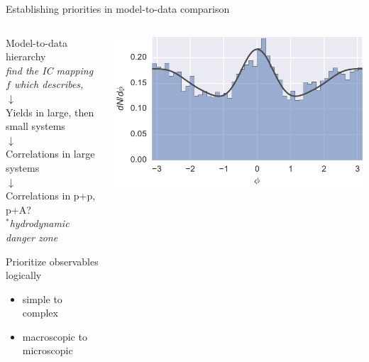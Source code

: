 \documentclass[aspectratio=43]{beamer}
\theoremstyle{definition}
\begin{document}
\begin{frame}{Establishing priorities in model-to-data comparison}
  \begin{columns}
    \begin{column}{.4\textwidth}
      \centering
      Model-to-data hierarchy \\[1ex]
      \scriptsize \emph{find the IC mapping $f$ which describes,} \\[1ex]
      $\downarrow$ \\[1ex]
      Yields in large, then small systems \\[1ex] 
      $\downarrow$ \\[1ex]
      Correlations in large systems \\[1ex]
      $\downarrow$ \\[1ex]
      Correlations in p+p, p+A? \\[1ex]
      \emph{$^*$hydrodynamic danger zone} \\
      \bigskip
      \begin{block}{\scriptsize Prioritize observables logically}
        \vspace{-.1 cm}
        \begin{itemize}
          \item simple to complex\\
          \item macroscopic to microscopic
        \end{itemize}
      \end{block}
    \end{column}
    \begin{column}{.5\textwidth}
      \centering
      \includegraphics[width=\textwidth]{yields} \\[1ex]

\end{column}
\end{columns}
\end{frame}
\end{document}

